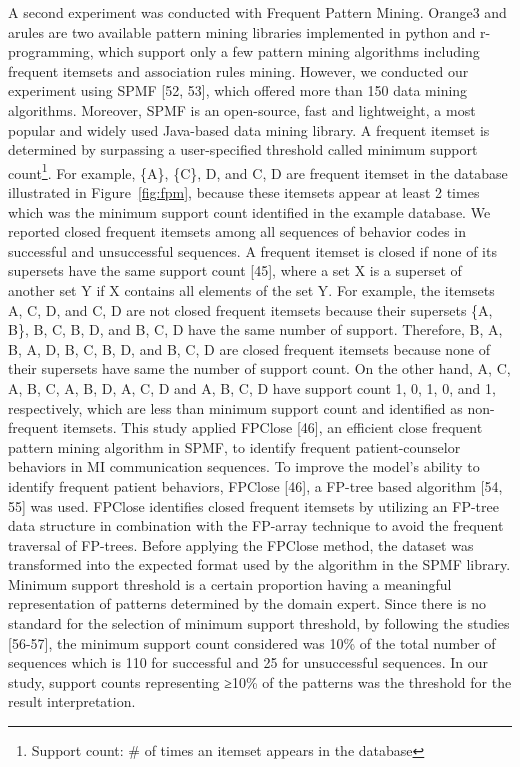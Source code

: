 A second experiment was conducted with Frequent Pattern Mining. Orange3 and arules are two available pattern mining libraries implemented in python and r-programming, which support only a few pattern mining algorithms including frequent itemsets and association rules mining. However, we conducted our experiment using SPMF [52, 53], which offered more than 150 data mining algorithms. Moreover, SPMF is an open-source, fast and lightweight, a most popular and widely used Java-based data mining library. A frequent itemset is determined by surpassing a user-specified threshold called minimum support count\footnote{Support count: \# of times an itemset appears in the database}. For example, \{A\}, \{C\}, {D}, and {C, D} are frequent itemset in the database illustrated in Figure~\ref{fig:fpm}, because these itemsets appear at least 2 times which was the minimum support count identified in the example database. We reported closed frequent itemsets among all sequences of behavior codes in successful and unsuccessful sequences. A frequent itemset is closed if none of its supersets have the same support count [45], where a set X is a superset of another set Y if X contains all elements of the set Y. For example, the itemsets {A}, {C}, {D}, and {C, D} are not closed frequent itemsets because their supersets \{A, B\}, {B, C}, {B, D}, and {B, C, D} have the same number of support. Therefore, {B}, {A, B}, {A, D}, {B, C}, {B, D}, and {B, C, D} are closed frequent itemsets because none of their supersets have same the number of support count. On the other hand, {A, C}, {A, B, C}, {A, B, D}, {A, C, D} and {A, B, C, D} have support count 1, 0, 1, 0, and 1, respectively, which are less than minimum support count and identified as non-frequent itemsets. This study applied FPClose [46], an efficient close frequent pattern mining algorithm in SPMF, to identify frequent patient-counselor behaviors in MI communication sequences. To improve the model’s ability to identify frequent patient behaviors, FPClose [46], a FP-tree based algorithm [54, 55] was used. FPClose identifies closed frequent itemsets by utilizing an FP-tree data structure in combination with the FP-array technique to avoid the frequent traversal of FP-trees. Before applying the FPClose method, the dataset was transformed into the expected format used by the algorithm in the SPMF library. Minimum support threshold is a certain proportion having a meaningful representation of patterns determined by the domain expert. Since there is no standard for the selection of minimum support threshold, by following the studies [56-57], the minimum support count considered was 10\% of the total number of sequences which is 110 for successful and 25 for unsuccessful sequences. In our study, support counts representing ≥10\% of the patterns was the threshold for the result interpretation. 

